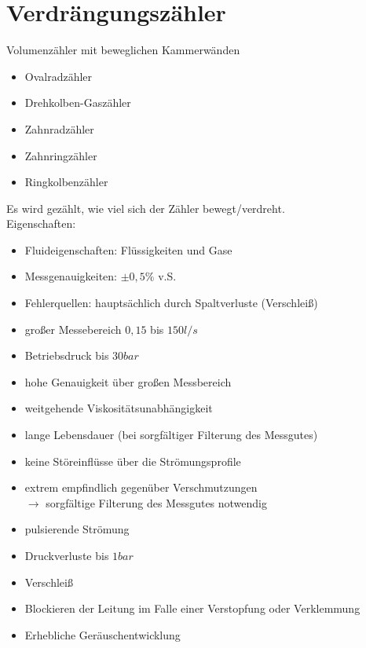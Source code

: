 \documentclass{scrreprt}
\begin{document}
\section{Verdrängungszähler}
Volumenzähler mit beweglichen Kammerwänden
\begin{itemize}
\item Ovalradzähler
\item Drehkolben-Gaszähler
\item Zahnradzähler
\item Zahnringzähler
\item Ringkolbenzähler
\end{itemize}
Es wird gezählt, wie viel sich der Zähler bewegt/verdreht.\\
Eigenschaften:
\begin{itemize}
\item Fluideigenschaften: Flüssigkeiten und Gase
\item Messgenauigkeiten: $\pm 0,5\%$ v.S.
\item Fehlerquellen: hauptsächlich durch Spaltverluste (Verschleiß)
\end{itemize}
\begin{itemize}[label=$+$]
\item großer Messebereich $0,15$ bis $150 \unit{l/s}$
\item Betriebsdruck bis $30 \unit{bar}$
\item hohe Genauigkeit über großen Messbereich
\item weitgehende Viskositätsunabhängigkeit
\item lange Lebensdauer (bei sorgfältiger Filterung des Messgutes)
\item keine Störeinflüsse über die Strömungsprofile
\end{itemize}
\begin{itemize}[label=$-$]
\item extrem empfindlich gegenüber Verschmutzungen\\
$\to$ sorgfältige Filterung des Messgutes notwendig
\item pulsierende Strömung
\item Druckverluste bis $1 \unit{bar}$
\item Verschleiß
\item Blockieren der Leitung im Falle einer Verstopfung oder Verklemmung
\item Erhebliche Geräuschentwicklung
\end{itemize}
\end{document}
